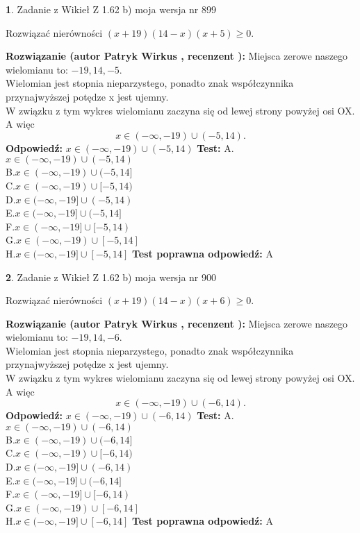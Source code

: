 \documentclass[12pt, a4paper]{article}
\theoremstyle{definition} %
\newtheorem{zad}{}
\newcommand{\zadStart}[1]{\begin{zad}#1\newline}
\newcommand{\zadStop}{\end{zad}}
\newcommand{\rozwStart}[2]{\noindent \textbf{Rozwiązanie (autor #1 , recenzent #2): }\newline}
\newcommand{\rozwStop}{\newline}
\newcommand{\odpStart}{\noindent \textbf{Odpowiedź:}\newline}
\newcommand{\odpStop}{\newline}
\newcommand{\testStart}{\noindent \textbf{Test:}\newline}
\newcommand{\testStop}{\newline}
\newcommand{\kluczStart}{\noindent \textbf{Test poprawna odpowiedź:}\newline}
\newcommand{\kluczStop}{\newline}
\begin{document}
\zadStart{Zadanie z Wikieł Z 1.62 b) moja wersja nr 899}

Rozwiązać nierówności $(x+19)(14-x)(x+5)\ge0$.
\zadStop
\rozwStart{Patryk Wirkus}{}
Miejsca zerowe naszego wielomianu to: $-19, 14, -5$.\\
Wielomian jest stopnia nieparzystego, ponadto znak współczynnika przy\linebreak najwyższej potędze x jest ujemny.\\ W związku z tym wykres wielomianu zaczyna się od lewej strony powyżej osi OX. A więc $$x \in (-\infty,-19) \cup (-5,14).$$
\rozwStop
\odpStart
$x \in (-\infty,-19) \cup (-5,14)$
\odpStop
\testStart
A.$x \in (-\infty,-19) \cup (-5,14)$\\
B.$x \in (-\infty,-19) \cup (-5,14]$\\
C.$x \in (-\infty,-19) \cup [-5,14)$\\
D.$x \in (-\infty,-19] \cup (-5,14)$\\
E.$x \in (-\infty,-19] \cup (-5,14]$\\
F.$x \in (-\infty,-19] \cup [-5,14)$\\
G.$x \in (-\infty,-19) \cup [-5,14]$\\
H.$x \in (-\infty,-19] \cup [-5,14]$
\testStop
\kluczStart
A
\kluczStop



\zadStart{Zadanie z Wikieł Z 1.62 b) moja wersja nr 900}

Rozwiązać nierówności $(x+19)(14-x)(x+6)\ge0$.
\zadStop
\rozwStart{Patryk Wirkus}{}
Miejsca zerowe naszego wielomianu to: $-19, 14, -6$.\\
Wielomian jest stopnia nieparzystego, ponadto znak współczynnika przy\linebreak najwyższej potędze x jest ujemny.\\ W związku z tym wykres wielomianu zaczyna się od lewej strony powyżej osi OX. A więc $$x \in (-\infty,-19) \cup (-6,14).$$
\rozwStop
\odpStart
$x \in (-\infty,-19) \cup (-6,14)$
\odpStop
\testStart
A.$x \in (-\infty,-19) \cup (-6,14)$\\
B.$x \in (-\infty,-19) \cup (-6,14]$\\
C.$x \in (-\infty,-19) \cup [-6,14)$\\
D.$x \in (-\infty,-19] \cup (-6,14)$\\
E.$x \in (-\infty,-19] \cup (-6,14]$\\
F.$x \in (-\infty,-19] \cup [-6,14)$\\
G.$x \in (-\infty,-19) \cup [-6,14]$\\
H.$x \in (-\infty,-19] \cup [-6,14]$
\testStop
\kluczStart
A
\kluczStop
\end{document}
